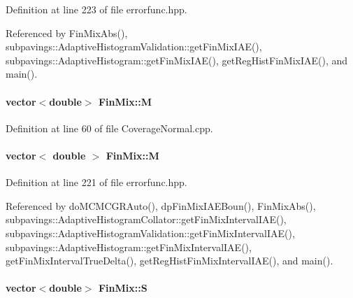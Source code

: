 \-Definition at line 223 of file errorfunc.\-hpp.



\-Referenced by \-Fin\-Mix\-Abs(), subpavings\-::\-Adaptive\-Histogram\-Validation\-::get\-Fin\-Mix\-I\-A\-E(), subpavings\-::\-Adaptive\-Histogram\-::get\-Fin\-Mix\-I\-A\-E(), get\-Reg\-Hist\-Fin\-Mix\-I\-A\-E(), and main().

\hypertarget{structFinMix_aaef54338ed42427daaa1a4567f042a26}{
\paragraph[{\-M}]{\setlength{\rightskip}{0pt plus 5cm}vector$<$double$>$ {\bf \-Fin\-Mix\-::\-M}}}\label{structFinMix_aaef54338ed42427daaa1a4567f042a26}


\-Definition at line 60 of file \-Coverage\-Normal.\-cpp.

\hypertarget{structFinMix_af6b13f65037448ae8a22965ccffd9330}{
\paragraph[{\-M}]{\setlength{\rightskip}{0pt plus 5cm}vector$<$ double $>$ {\bf \-Fin\-Mix\-::\-M}}}\label{structFinMix_af6b13f65037448ae8a22965ccffd9330}


\-Definition at line 221 of file errorfunc.\-hpp.



\-Referenced by do\-M\-C\-M\-C\-G\-R\-Auto(), dp\-Fin\-Mix\-I\-A\-E\-Boun(), \-Fin\-Mix\-Abs(), subpavings\-::\-Adaptive\-Histogram\-Collator\-::get\-Fin\-Mix\-Interval\-I\-A\-E(), subpavings\-::\-Adaptive\-Histogram\-Validation\-::get\-Fin\-Mix\-Interval\-I\-A\-E(), subpavings\-::\-Adaptive\-Histogram\-::get\-Fin\-Mix\-Interval\-I\-A\-E(), get\-Fin\-Mix\-Interval\-True\-Delta(), get\-Reg\-Hist\-Fin\-Mix\-Interval\-I\-A\-E(), and main().

\hypertarget{structFinMix_a3a9d330805184d137baf041fcc18c24a}{
\paragraph[{\-S}]{\setlength{\rightskip}{0pt plus 5cm}vector$<$double$>$ {\bf \-Fin\-Mix\-::\-S}}}\label{structFinMix_a3a9d330805184d137baf041fcc18c24a}


